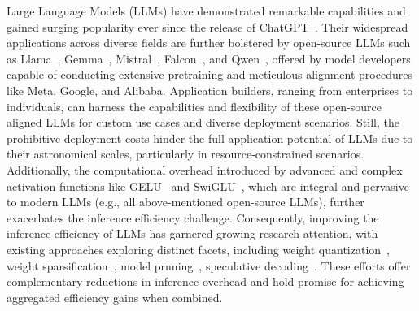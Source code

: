

Large Language Models (LLMs) have demonstrated remarkable capabilities and gained surging popularity ever since the release of ChatGPT~\cite{OpenAI2023ChatGPT}. Their widespread applications across diverse fields are further bolstered by open-source LLMs such as Llama~\cite{touvron2023llama}, Gemma~\cite{team2024gemma}, Mistral~\cite{jiang2023mistral}, Falcon~\cite{almazrouei2023falcon}, and Qwen~\cite{bai2023qwen}, offered by model developers capable of conducting extensive pretraining and meticulous alignment procedures like Meta, Google, and Alibaba. Application builders, ranging from enterprises to individuals, can harness the capabilities and flexibility of these open-source aligned LLMs for custom use cases and diverse deployment scenarios. Still, the prohibitive deployment costs hinder the full application potential of LLMs due to their astronomical scales, particularly in resource-constrained scenarios. Additionally, the computational overhead introduced by advanced and complex activation functions like GELU~\cite{hendrycks2016gaussian} and SwiGLU~\cite{elfwing2018sigmoid}, which are integral and pervasive to modern LLMs (e.g., all above-mentioned open-source LLMs), further exacerbates the inference efficiency challenge. Consequently, improving the inference efficiency of LLMs has garnered growing research attention, with existing approaches exploring distinct facets, including weight quantization~\cite{lin2024awq,gptq2023,huang2024billm}, weight sparsification~\cite{frantar2023sparsegpt, ma2023llm, xia2023sheared, wang2019structured}, model pruning~\cite{frantar2023sparsegpt,sun2023simple,ma2023llm}, speculative decoding~\cite{leviathan2023fast, kim2024speculative}. These efforts offer complementary reductions in inference overhead and hold promise for achieving aggregated efficiency gains when combined.



